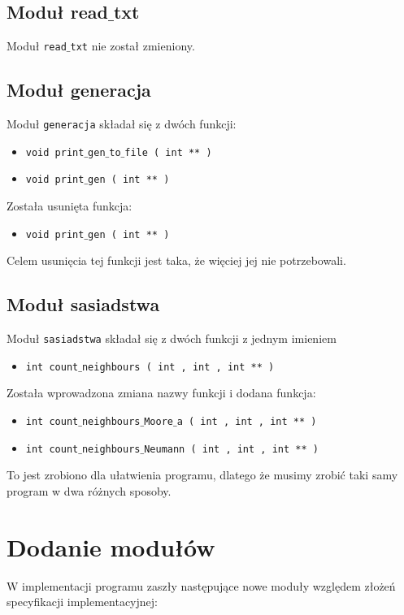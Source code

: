 \documentclass[a4paper, 12pt]{article}
\begin{document}
		\subsection{Moduł read$\_$txt} 
			\hspace*{1cm} Moduł \texttt{read$\_$txt} nie został zmieniony.
\newpage
		\subsection{Moduł generacja}
			\hspace*{1cm} Moduł \texttt{generacja} składał się z dwóch funkcji: 
		\begin{itemize}
			\item \texttt{void print$\_$gen$\_$to$\_$file ( int ** )} 
			\item \texttt{void print$\_$gen ( int ** )} 
		\end{itemize}
			\hspace*{1cm} Została usunięta funkcja: 
		\begin{itemize}
			\item \texttt{void print$\_$gen ( int ** )} 
		\end{itemize}
			\hspace*{1cm} Celem usunięcia tej funkcji jest taka, że więciej jej nie potrzebowali.		
			
		\subsection{Moduł sasiadstwa}
			\hspace*{1cm} Moduł \texttt{sasiadstwa} składał się z dwóch funkcji z jednym imieniem 
		\begin{itemize}
			\item \texttt{int count$\_$neighbours ( int , int , int ** )} 
		\end{itemize}
			\hspace*{1cm} Została wprowadzona zmiana nazwy funkcji i dodana funkcja: 
		\begin{itemize}
			\item \texttt{int count$\_$neighbours$\_$Moore$\_$a ( int , int , int ** )}
			\item \texttt{int count$\_$neighbours$\_$Neumann ( int , int , int ** )}
		\end{itemize}
			\hspace*{1cm} To jest zrobiono dla ułatwienia programu, dlatego że musimy zrobić taki samy program w dwa różnych sposoby.
\newpage
	\section{Dodanie modułów}
			\hspace*{1cm} W implementacji programu zaszły następujące nowe moduły względem złożeń specyfikacji implementacyjnej:
\end{document}
